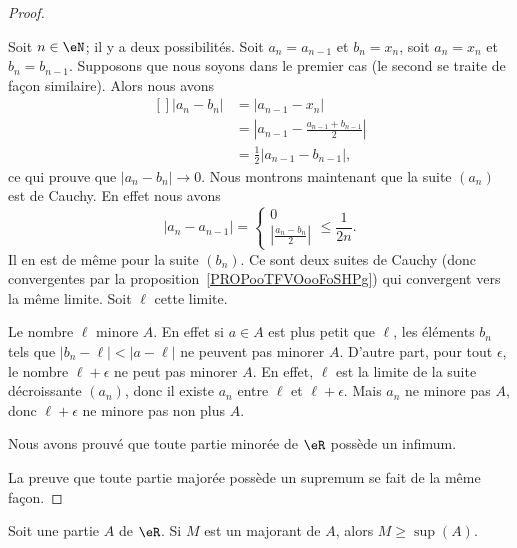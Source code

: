 \begin{proof}
\begin{subproof}
		Soit \( n\in\eN\); il y a deux possibilités. Soit \( a_n=a_{n-1}\) et \( b_n=x_n\), soit \( a_n=x_n\) et \( b_n=b_{n-1}\). Supposons que nous soyons dans le premier cas (le second se traite de façon similaire). Alors nous avons
		\begin{equation}
			\begin{aligned}[]
				| a_n-b_n | & =| a_{n-1}-x_n |                                    \\
				            & =\left| a_{n-1}-\frac{ a_{n-1}+b_{n-1} }{2} \right| \\
				            & =\frac{ 1 }{2}| a_{n-1}-b_{n-1} |,
			\end{aligned}
		\end{equation}
		ce qui prouve que \( | a_n-b_n |\to 0\). Nous montrons maintenant que la suite \( (a_n)\) est de Cauchy. En effet nous avons
		\begin{equation}
			| a_n-a_{n-1} |=\begin{cases}
				0 \\
				\left| \frac{ a_n -b_n}{ 2} \right|
			\end{cases}\leq \frac{1}{ 2n }.
		\end{equation}
		Il en est de même pour la suite \( (b_n)\). Ce sont deux suites de Cauchy (donc convergentes par la proposition~\ref{PROPooTFVOooFoSHPg}) qui convergent vers la même limite. Soit \( \ell\) cette limite.

		Le nombre \( \ell\) minore \( A\). En effet si \( a\in A\) est plus petit que \( \ell\), les éléments \( b_n\) tels que \( | b_n-\ell |<| a-\ell |\) ne peuvent pas minorer \( A\). D'autre part, pour tout \( \epsilon\), le nombre \( \ell+\epsilon\) ne peut pas minorer \( A\). En effet, \( \ell\) est la limite de la suite décroissante \( (a_n)\), donc il existe \( a_n\) entre \( \ell\) et \( \ell+\epsilon\). Mais \( a_n\) ne minore pas \( A\), donc \( \ell+\epsilon\) ne minore pas non plus \( A\).

		Nous avons prouvé que toute partie minorée de \( \eR\) possède un infimum.
	\end{subproof}

	La preuve que toute partie majorée possède un supremum se fait de la même façon.
\end{proof}

\begin{lemma}       \label{LEMooSSVKooDPhSkq}
	Soit une partie \( A\) de \( \eR\). Si \( M\) est un majorant de \( A\), alors \( M\geq \sup(A)\).
\end{lemma}

